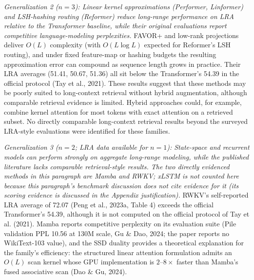 \documentclass[10pt,twocolumn]{article}
\begin{document}
\textit{Generalization 2 ($n = 3$): Linear kernel approximations (Performer, Linformer) and LSH-hashing routing (Reformer) reduce long-range performance on LRA relative to the Transformer baseline, while their original evaluations report competitive language-modeling perplexities.} FAVOR+ and low-rank projections deliver $O(L)$ complexity (with $O(L\log L)$ expected for Reformer's LSH routing), and under fixed feature-map or hashing budgets the resulting approximation error can compound as sequence length grows in practice. Their LRA averages (51.41, 50.67, 51.36) all sit below the Transformer's 54.39 in the official protocol (Tay et al., 2021). These results suggest that these methods may be poorly suited to long-context retrieval without hybrid augmentation, although comparable retrieval evidence is limited. Hybrid approaches could, for example, combine kernel attention for most tokens with exact attention on a retrieved subset. No directly comparable long-context retrieval results beyond the surveyed LRA-style evaluations were identified for these families.

\textit{Generalization 3 ($n = 2$; LRA data available for $n = 1$): State-space and recurrent models can perform strongly on aggregate long-range modeling, while the published literature lacks comparable retrieval-style results. The two directly evidenced methods in this paragraph are Mamba and RWKV; xLSTM is not counted here because this paragraph's benchmark discussion does not cite evidence for it (its scoring evidence is discussed in the Appendix justification).} RWKV's self-reported LRA average of 72.07 (Peng et al., 2023a, Table 4) exceeds the official Transformer's 54.39, although it is not computed on the official protocol of Tay et al. (2021). Mamba reports competitive perplexity on its evaluation suite (Pile validation PPL 10.56 at 130M scale, Gu \& Dao, 2024; the paper reports no WikiText-103 value), and the SSD duality provides a theoretical explanation for the family's efficiency: the structured linear attention formulation admits an $O(L)$ scan kernel whose GPU implementation is $2$--$8\times$ faster than Mamba's fused associative scan (Dao \& Gu, 2024).
\end{document}
